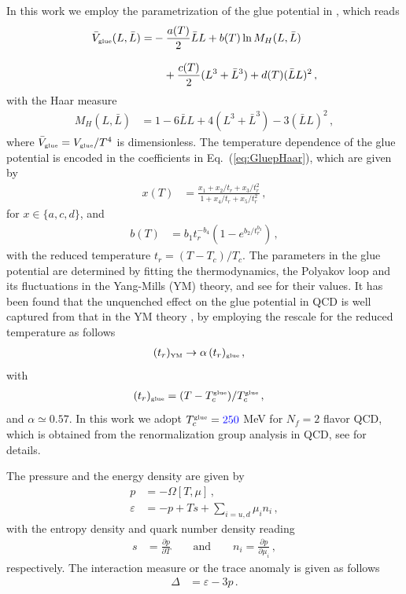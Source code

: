 \documentclass[%
reprint,
superscriptaddress,
showpacs,preprintnumbers,
 amsmath,amssymb,
 aps,
prd,
]{revtex4-1}
\def\Eq#1{Eq.~(\ref{#1})}
\newcommand{\colsy}[1]{\textcolor{blue}{#1}}
\begin{document}
In this work we employ the parametrization of the glue potential in \cite{Lo:2013hla}, which reads 
\begin{align}
  \bar V_{\text{\tiny{glue}}}(L,\bar L)=& -\frac{a(T)}{2} \bar L L + b(T)\ln M_H(L,\bar{L})\nonumber \\[2ex]
  &\quad + \frac{c(T)}{2} (L^3+\bar L^3) + d(T) (\bar{L} L)^2\,,\label{eq:GluepHaar}
\end{align}
with the Haar measure 
\begin{align}
M_H (L, \bar{L})&= 1 -6 \bar{L}L + 4 (L^3+\bar{L}^3) - 3  (\bar{L}L)^2\,,
\end{align}
where $\bar V_{\text{\tiny{glue}}}=V_{\text{\tiny{glue}}}/T^4$ is dimensionless. The temperature dependence of the glue potential is encoded in the coefficients in \Eq{eq:GluepHaar}, which are given by
\begin{align}
  x(T) &= \frac{x_1 + x_2/t_r + x_3/t_r^2}{1 + x_4/t_r + x_5/t_r^2}\,,\label{eq:xT}
\end{align}
for $x\in \{a, c, d\}$, and 
\begin{align}
  b(T) &=b_1 t_r^{-b_4} (1 -e^{b_2/t_r^{b_3}} )\,,\label{eq:bT}
\end{align}
with the reduced temperature $t_r=(T-T_c)/T_c$. The parameters in the glue potential are determined by fitting the thermodynamics, the Polyakov loop and its fluctuations in the Yang-Mills (YM) theory, and see  \cite{Lo:2013hla} for their values. It has been found that the unquenched effect on the glue potential in QCD is well captured from that in the YM theory \cite{Haas:2013qwp}, by employing the rescale for the reduced temperature as follows
\begin{align}
  (t_r)_{\text{\tiny{YM}}}&\rightarrow \alpha\,(t_r)_{\text{\tiny{glue}}}\,,\label{}
\end{align}
with
\begin{align}
  (t_r)_{\text{\tiny{glue}}}&=(T-T_c^\text{\tiny{glue}})/T_c^\text{\tiny{glue}}\,,\label{}
\end{align}
and $\alpha \simeq 0.57$. In this work we adopt $T_c^\text{\tiny{glue}}=\colsy{250}$ MeV for $N_f=2$ flavor QCD, which is obtained from the renormalization group analysis in QCD, see \cite{Schaefer:2007pw} for details.

The pressure and the energy density are given by
\begin{align}
  p&=-\Omega[T,\mu]\,,\\[2ex]
 \varepsilon&=-p+Ts +\sum_{i=u,d}\mu_i n_i\,,\label{}
\end{align}
with the entropy density and quark number density reading 
\begin{align}
  s&=\frac{\partial p}{\partial T}\qquad \text{and}\qquad n_i=\frac{\partial p}{\partial \mu_i}\,,\label{}
\end{align}
respectively. The interaction measure or the trace anomaly is given as follows
\begin{align}
  \Delta&=\varepsilon-3p\,.\label{}
\end{align}
\end{document}
